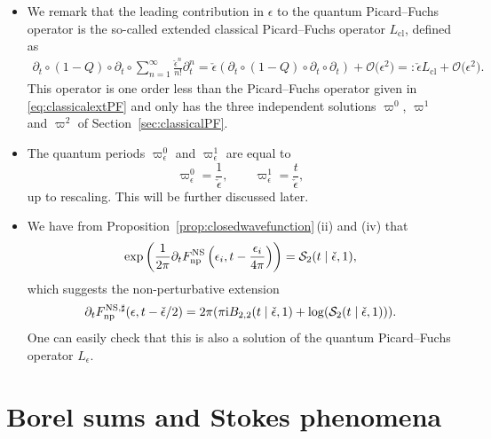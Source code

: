 \documentclass[pdftex]{sigma}
\numberwithin{equation}{section}
\begin{document}
\begin{Remark}\quad
\begin{itemize}\itemsep=0pt
 \item We remark that the leading contribution in $\epsilon$ to the quantum Picard--Fuchs operator is the so-called extended classical Picard--Fuchs operator $L_{\text{cl}}$, defined as
\begin{gather*}
 \partial_t \circ (1-Q) \circ \partial_t \circ \sum_{n=1}^{\infty} \frac{\check{\epsilon}^n}{n!} \partial_t^n = \check{\epsilon} (\partial_t \circ (1-Q)\circ \partial_t \circ \partial_t ) + \mathcal{O}\big(\epsilon^2\big)
 =: \check{\epsilon} L_{\text{cl}} + \mathcal{O}\big(\epsilon^2\big).
\end{gather*}
This operator is one order less than the Picard--Fuchs operator given in \eqref{eq:classicalextPF} and only has the three independent solutions $\varpi^0$, $\varpi^1$ and $\varpi^2$ of Section~\ref{sec:classicalPF}.

\item The quantum periods $\varpi^0_{\epsilon}$ and $\varpi^1_{\epsilon}$ are equal to
\begin{equation*}
 \varpi^0_{\epsilon}=\frac{1}{\check{\epsilon}}, \qquad \varpi^1_{\epsilon} = \frac{t}{\check{\epsilon}},
 \end{equation*}
up to rescaling. This will be further discussed later.

\item We have from Proposition~\ref{prop:closedwavefunction}\,(ii) and (iv) that
\begin{equation*}
 \exp\left( \frac{1}{2\pi} \partial_t F^{\rm NS}_{{\rm np}} \left(\epsilon_i,t-\frac{\epsilon_i}{4\pi}\right) \right) = \mathcal{S}_2(t\mid \check{\epsilon},1),
\end{equation*}
which suggests the non-perturbative extension
\begin{equation}\label{eq:nonpertquantumperiodwithclassical}
 \partial_t F^{{\rm NS},\sharp}_{{\rm np}}(\epsilon,t-\check{\epsilon}/2) = 2\pi (\pi \mathrm{i} B_{2,2}(t\mid \check{\epsilon},1) + \log(\mathcal{S}_2(t\mid \check{\epsilon},1)) ).
 \end{equation}
One can easily check that this is also a solution of the quantum Picard--Fuchs operator $L_\epsilon$.
\end{itemize}
\end{Remark}

\section{Borel sums and Stokes phenomena}\label{sec:Borelsums}
\end{document}
